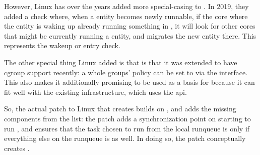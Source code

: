 However, Linux has over the years added more special-casing to \schedidle{}. In
2019, they added a check where, when a \schednormal{} entity becomes newly
runnable, if the core where the entity is waking up already running something in
\schednormal{}, it will look for other cores that might be currently running a
\schedidle{} entity, and migrates the new entity there. This represents the
wakeup or entry check.

The other special thing Linux added is that \schedidle{} is that it was extended
to have cgroup support recently\cite{TODO}: a whole groups' policy can be set to
\schedidle{} via the \cgroups{} interface. This also makes it additionally
promising to be used as a basis for \schedbe{} because it can fit well with the
existing infrastructure, which uses the \cgroups{} api.

So, the actual patch to Linux that creates \schedbe{} builds on \schedidle{},
and adds the missing components from the list: the patch adds a synchronization
point on starting to run \schedidle{}, and ensures that the task chosen to run
from the local runqueue is only \schedidle{} if everything else on the runqueue
is as well. In doing so, the patch conceptually creates \schedbe{}.